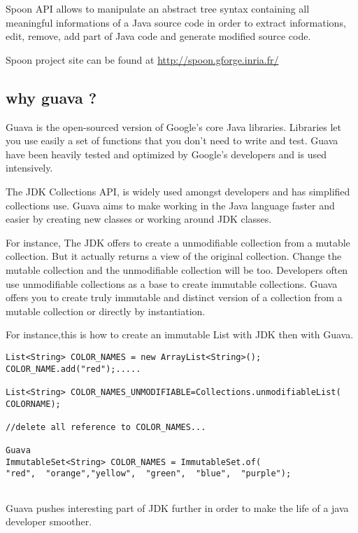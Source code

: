 \documentclass[paper=a4, fontsize=11pt]{scrartcl}
\numberwithin{equation}{section}%
\numberwithin{figure}{section}%
\numberwithin{table}{section}%
\begin{document}
Spoon API allows to manipulate an abstract tree syntax containing all
meaningful informations of a Java source code in order to extract
informations, edit, remove, add part of Java code and generate
modified source code.\newline

Spoon project site can be found at \url{http://spoon.gforge.inria.fr/}

\subsection{why guava ?}

Guava is the open-sourced version of Google's core Java libraries.
Libraries let you use easily a set of functions that you don't need to
write and test. 
Guava have been heavily tested and optimized by Google's developers
and is used intensively.\newline

The JDK Collections API, is widely used amongst developers and has
simplified collections use. 
Guava aims to make working in the Java language faster and easier by
creating new classes or working around JDK classes.

\newpage
For instance, The JDK offers to create a unmodifiable collection from
a mutable collection. But it actually returns a view of the original
collection. Change the mutable collection and the unmodifiable
collection will be too. Developers often use unmodifiable collections
as a base to create immutable collections. Guava offers you to create
truly immutable and distinct version of a collection from a mutable
collection or directly by instantiation.\newline


For instance,this is how to create an immutable List with JDK then with Guava.
\begin{verbatim}
List<String> COLOR_NAMES = new ArrayList<String>();
COLOR_NAME.add("red");.....

List<String> COLOR_NAMES_UNMODIFIABLE=Collections.unmodifiableList(
COLORNAME);

//delete all reference to COLOR_NAMES...

Guava
ImmutableSet<String> COLOR_NAMES = ImmutableSet.of(  
"red",  "orange","yellow",  "green",  "blue",  "purple");


\end{verbatim}

Guava pushes interesting part of JDK further in order to make the life
of a java developer smoother.\newline
\end{document}
